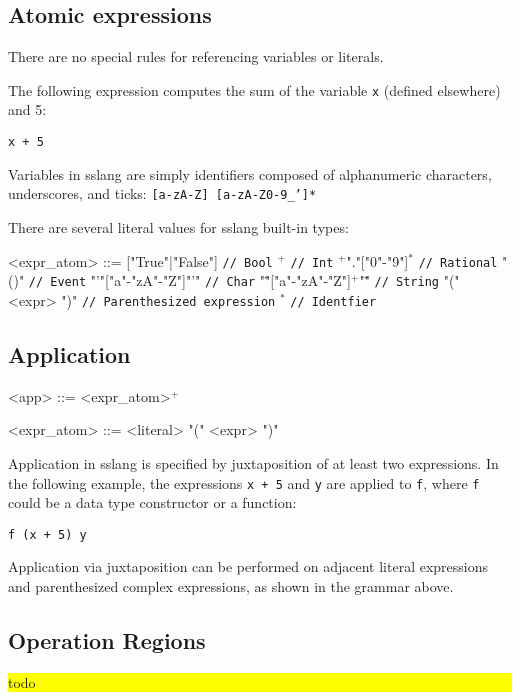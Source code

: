 \documentclass{article}
\newcommand{\fixme}[1]{
  \noindent\colorbox{yellow}{\parbox{\dimexpr\linewidth-2\fboxsep}{#1}}%
}
\begin{document}
\subsection{Atomic expressions}
There are no special rules for referencing variables or literals.

The following expression computes the sum of the variable \texttt{x} (defined elsewhere) and 5:
\begin{lstlisting}
x + 5
\end{lstlisting}
Variables in sslang are simply identifiers composed of alphanumeric characters, underscores, and ticks: \texttt{[a-zA-Z] [a-zA-Z0-9_']*}

There are several literal values for sslang built-in types:

\begin{grammar}
<expr_atom> ::= ["True"|"False"] \texttt{// Bool}
\alt ["0"-"9"]$^{+}$ \texttt{// Int}
\alt ["0"-"9"]$^{+}$"."["0"-"9"]$^{*}$ \texttt{// Rational}
\alt "()" \texttt{// Event}
\alt "'"["a"-"zA"-"Z"]"'" \texttt{// Char}
\alt "\""["a"-"zA"-"Z"]$^{+}$"\"" \texttt{// String}
\alt "(" <expr> ")" \texttt{// Parenthesized expression}
\alt ["a"-"zA"-"Z"] ["a"-"zA"-"Z0"-"9_'"]$^{*}$ \texttt{// Identfier}
\end{grammar}
\subsection{Application}
\begin{grammar}
<app> ::= <expr_atom>$^{+}$

<expr_atom> ::= <literal>
\alt "(" <expr> ")"
\end{grammar}

Application in sslang is specified by juxtaposition of at least two expressions. In the following example, the expressions \texttt{x + 5} and \texttt{y} are applied to \texttt{f}, where \texttt{f} could be a data type constructor or a function:
\begin{lstlisting}
f (x + 5) y
\end{lstlisting}

Application via juxtaposition can be performed on adjacent literal expressions and parenthesized complex expressions, as shown in the grammar above.

\subsection{Operation Regions}
\fixme{todo}
\end{document}
